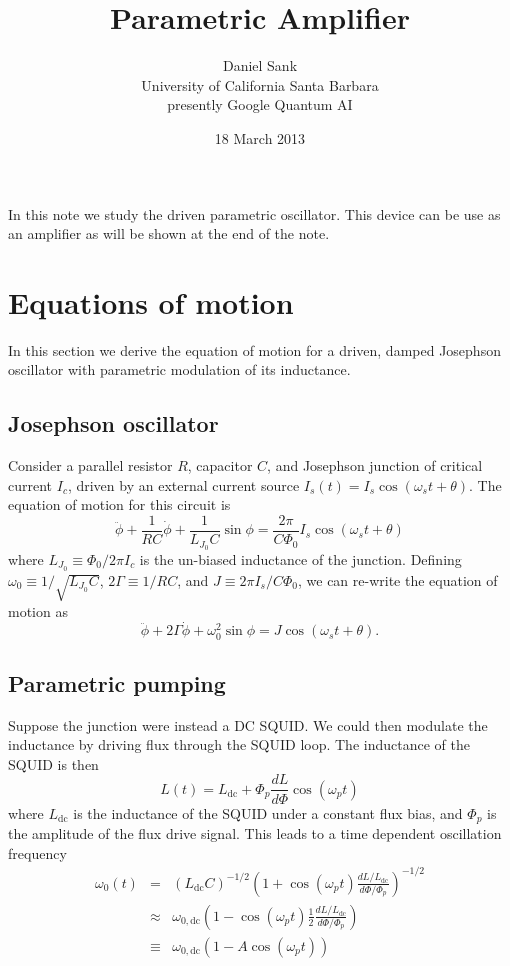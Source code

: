 \documentclass{article}
\title{Parametric Amplifier}
\author{Daniel Sank\\
\small{University of California Santa Barbara}\\
\small{presently Google Quantum AI}}
\date{18 March 2013}
\begin{document}
\maketitle

In this note we study the driven parametric oscillator.
This device can be use as an amplifier as will be shown at the end of the note.

\section{Equations of motion}

In this section we derive the equation of motion for a driven, damped Josephson oscillator with parametric modulation of its inductance.

\subsection{Josephson oscillator}

Consider a parallel resistor $R$, capacitor $C$, and Josephson junction of critical current $I_c$, driven by an external current source $I_s(t) = I_s \cos(\omega_s t + \theta)$.
The equation of motion for this circuit is
\begin{equation}
\ddot{\phi} + \frac{1}{RC}\dot{\phi} + \frac{1}{L_{J_0}C}\sin \phi = \frac{2\pi}{C \Phi_0} I_s \cos(\omega_s t + \theta)
\end{equation}
where $L_{J_0} \equiv \Phi_0 / 2\pi I_c$ is the un-biased inductance of the junction.
Defining $\omega_0 \equiv 1 / \sqrt{L_{J_0}C}$, $2 \Gamma \equiv 1/RC$, and $J \equiv  2\pi I_s / C \Phi_0$, we can re-write the equation of motion as
\begin{equation}
\ddot{\phi} + 2\Gamma \dot{\phi} + \omega_0^2 \sin \phi = J \cos(\omega_s t + \theta) .
\end{equation}

\subsection{Parametric pumping}

Suppose the junction were instead a DC SQUID. We could then modulate the inductance by driving flux through the SQUID loop. The inductance of the SQUID is then \begin{equation}
L(t) = L_{\textrm{dc}} + \Phi_p \frac{dL}{d\Phi}\cos(\omega_p t) \end{equation}
where $L_{\textrm{dc}}$ is the inductance of the SQUID under a constant flux bias, and $\Phi_p$ is the amplitude of the flux drive signal. This leads to a time dependent oscillation frequency \begin{eqnarray}
\omega_0(t) &=& (L_{\textrm{dc}}C)^{-1/2} \left(1 + \cos(\omega_p t) \frac{dL/L_{\textrm{dc}}} {d\Phi/\Phi_p} \right)^{-1/2} \\
&\approx& \omega_{0,\textrm{dc}} \left( 1 -\cos(\omega_p t) \frac{1}{2}\frac{dL/L_{\textrm{dc}}}{d\Phi/\Phi_p} \right) \\
&\equiv& \omega_{0,\textrm{dc}}\left( 1 - A\cos(\omega_p t) \right) \end{eqnarray}
\end{document}
